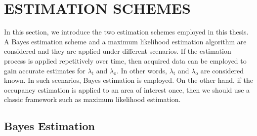 \chapter{ESTIMATION SCHEMES}

In this section, we introduce the two estimation schemes employed in this thesis.
A Bayes estimation scheme and a maximum likelihood estimation algorithm are considered and they are applied under different scenarios.
If the estimation process is applied repetitively over time, then acquired data can be employed to gain accurate estimates for $\lambda_{\mathrm{t}}$ and $\lambda_{\mathrm{o}}$.
In other words, $\lambda_{\mathrm{t}}$ and $\lambda_{\mathrm{o}}$ are considered known.
In such scenarios, Bayes estimation is employed.
On the other hand, if the occupancy estimation is applied to an area of interest once, then we should use a classic framework such as maximum likelihood estimation.


\section{Bayes Estimation} \label{section:BayesEstimation}

